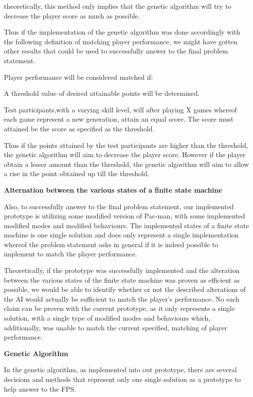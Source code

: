 theoretically, this method only implies that the genetic algorithm will try to decrease the player score as much as possible.

Thus if the implementation of the genetic algorithm was done accordingly with the following definition of matching player performance, we might have gotten other results that could be used to successfully answer to the final problem statement.

Player performance will be considered matched if:

A threshold value of desired attainable points will be determined.

Test participants,with a varying skill level, will after playing X games whereof each game represent a new generation, attain an equal score. The score must attained be the score as specified as the threshold.

 Thus if the points attained by the test participants are higher than the threshold, the genetic algorithm will aim to decrease the player score. However if the player obtain a lesser amount than the threshold, the genetic algorithm will aim to allow a rise in the point obtained up till the threshold.

 \textbf{Alternation between the various states of a finite state machine}

Also, to successfully answer to the final problem statement, our implemented prototype is utilizing some modified version of Pac-man, with some implemented modified modes and modified behaviours. The implemented states of a finite state machine is one single solution and does only represent a single implementation whereof the problem statement asks in general if it is indeed possible to implement to match the player performance.

Theoretically, if the prototype was successfully implemented and the alteration between the various states of the finite state machine was proven as efficient as possible, we would be able to identify whether or not the described alterations of the AI would actually be sufficient to match the player's performance. No such claim can be proven with the current prototype, as it only represents a single solution, with a single type of modified modes and behaviours which, additionally, was unable to match the current specified, matching of player performance.

\textbf{Genetic Algorithm}

In the genetic algorithm, as implemented into out prototype, there are several decisions and methods that represent only one single solution as a prototype to help answer to the FPS.

